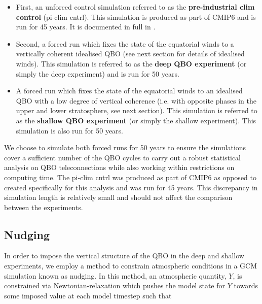 \begin{itemize}
    \item First, an unforced control simulation referred to as the \textbf{pre-industrial clim control} (pi-clim cntrl). This simulation is produced as part of CMIP6 and is run for 45 years. It is documented in full in \cite{oconnorAssessment2021b}. 
    
    \item Second, a forced run which fixes the state of the equatorial winds to a vertically coherent idealised QBO (see next section for details of idealised winds). This simulation is referred to as the \textbf{deep QBO experiment} (or simply the deep experiment) and is run for 50 years.
    
    \item A forced run which fixes the state of the equatorial winds to an idealised QBO with a low degree of vertical coherence (i.e. with opposite phases in the upper and lower stratosphere, see next section). This simulation is referred to as the \textbf{shallow QBO experiment} (or simply the shallow experiment). This simulation is also run for 50 years.
    
\end{itemize}

We choose to simulate both forced runs for 50 years to ensure the simulations cover a sufficient number of the QBO cycles to carry out a robust statistical analysis on QBO teleconnections while also working within restrictions on computing time. The pi-clim cntrl was produced as part of CMIP6 as opposed to created specifically for this analysis and was run for 45 years. This discrepancy in simulation length is relatively small and should not affect the comparison between the experiments. 



\subsection{Nudging}
In order to impose the vertical structure of the QBO in the deep and shallow experiments, we employ a method to constrain atmospheric conditions in a GCM simulation known as nudging. In this method, an atmospheric quantity, $Y$, is constrained via Newtonian-relaxation which pushes the model state for $Y$ towards some imposed value at each model timestep such that


